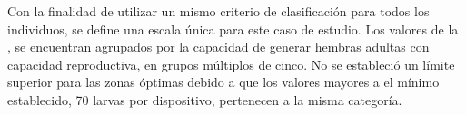 Con la finalidad de utilizar un mismo criterio de clasificación para todos los individuos, se
define una escala única para este caso de estudio. Los valores de la
, se encuentran agrupados por la capacidad de generar hembras
adultas con capacidad reproductiva, en grupos múltiplos de cinco. No se estableció un límite
superior para las zonas óptimas debido a que los valores mayores a el mínimo establecido, 70
larvas por dispositivo, pertenecen a la misma categoría.
